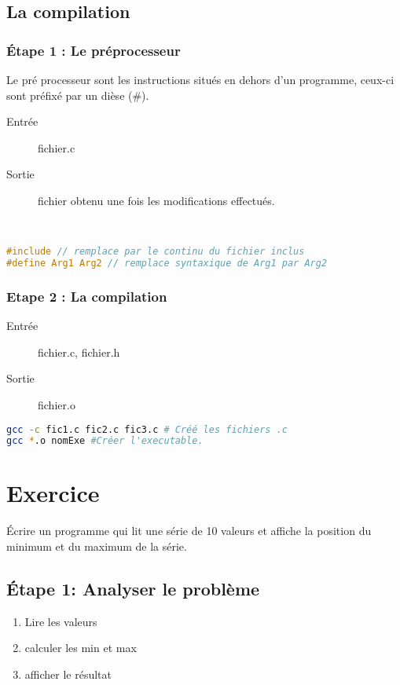 \documentclass[12pt,a4paper,openany]{article}
\begin{document}
\subsection{La compilation}
\subsubsection{\'Etape 1 : Le préprocesseur}
Le pré processeur sont les instructions situés en dehors d'un programme, ceux-ci sont préfixé par un dièse (\#).
\begin{description}
	\item[Entrée] fichier.c
	\item[Sortie] fichier obtenu une fois les modifications effectués.
\end{description}~
\begin{lstlisting}[language=C, caption=Exemple d'instructions pré-processeurs]
#include // remplace par le continu du fichier inclus
#define Arg1 Arg2 // remplace syntaxique de Arg1 par Arg2
\end{lstlisting}
\newpage
\subsubsection{Etape 2 : La compilation}
\begin{description}
	\item[Entrée] fichier.c, fichier.h
	\item[Sortie] fichier.o 
\end{description}
\begin{lstlisting}[language=bash]
gcc -c fic1.c fic2.c fic3.c # Créé les fichiers .c
gcc *.o nomExe #Créer l'executable.
\end{lstlisting}
\section{Exercice}
\'Ecrire un programme qui lit une série de 10 valeurs et affiche la position du minimum et du maximum de la série.
\subsection{\'Etape 1: Analyser le problème}
\begin{enumerate}
	\item Lire les valeurs
	\item calculer les min et max
	\item afficher le résultat
\end{enumerate}
\end{document}
